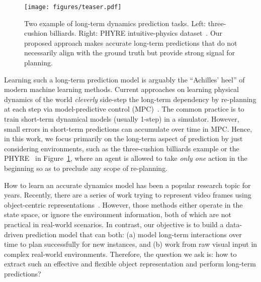 \documentclass{article} \usepackage{iclr2021_conference,times}
\begin{document}
\begin{figure}[t]
\centering
\texttt{[image: figures/teaser.pdf]}
\caption{Two example of long-term dynamics prediction tasks. Left: three-cushion billiards. Right: PHYRE  intuitive-physics dataset~\citep{bakhtin2019phyre}. Our proposed approach makes accurate long-term predictions that do not necessarily align with the ground truth but provide strong signal for planning.}
\label{fig:teaser}
\vspace{-1.5em}
\end{figure}

Learning such a long-term prediction model is arguably the ``Achilles' heel'' of modern machine learning methods. Current approaches on learning physical dynamics of the world \textit{cleverly} side-step the long-term dependency by re-planning at each step via model-predictive control (MPC)~\citep{allgower2012nonlinear,camacho2013model}. The common practice is to train short-term dynamical models (usually 1-step) in a simulator. However, small errors in short-term predictions can accumulate over time in MPC. Hence, in this work, we focus primarily on the long-term aspect of prediction by just considering environments, such as the three-cushion billiards example or the PHYRE~\citep{bakhtin2019phyre} in Figure~\ref{fig:teaser}, where an agent is allowed to take {\em only one} action in the beginning so as to preclude any scope of re-planning.

How to learn an accurate dynamics model has been a popular research topic for years. Recently, there are a series of work trying to represent video frames using object-centric representations~\citep{battaglia2016interaction,watters2017visual,chang2016compositional,janner2018reasoning,ye2019cvp,kipf2019contrastive}. However, those methods either operate in the state space, or ignore the environment information, both of which are not practical in real-world scenarios. In contrast, our objective is to build a data-driven prediction model that can both: (a) model long-term interactions over time to plan successfully for new instances, and (b) work from raw visual input in complex real-world environments. Therefore, the question we ask is: how to extract such an effective and flexible object representation and perform long-term predictions?
\end{document}
